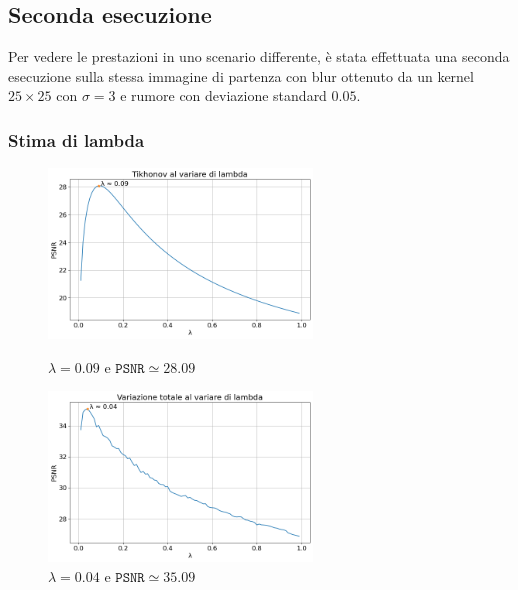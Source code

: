 \documentclass[11pt]{article}
\begin{document}
\subsection{Seconda esecuzione}
Per vedere le prestazioni in uno scenario differente, è stata effettuata una seconda esecuzione sulla stessa immagine di partenza con blur ottenuto da un kernel $25 \times 25$ con $\sigma=3$ e rumore con deviazione standard $0.05$.

\subsubsection{Stima di lambda}
\begin{figure}[H]
    \centering
    \begin{minipage}{0.45\textwidth}
        \centering
        \includegraphics[width=7cm]{esecuzione/2/tikhonov_lambda.png}
        \caption{$\lambda=0.09$ e $\texttt{PSNR} \simeq 28.09$}
        \label{fig:tikhonov_lambda2}
    \end{minipage}\hfill
    \begin{minipage}{0.45\textwidth}
        \centering
        \includegraphics[width=7cm]{esecuzione/2/tv_lambda.png}
        \caption{$\lambda=0.04$ e $\texttt{PSNR} \simeq 35.09$}
        \label{fig:tv_lambda2}
    \end{minipage}
\end{figure}
\end{document}
